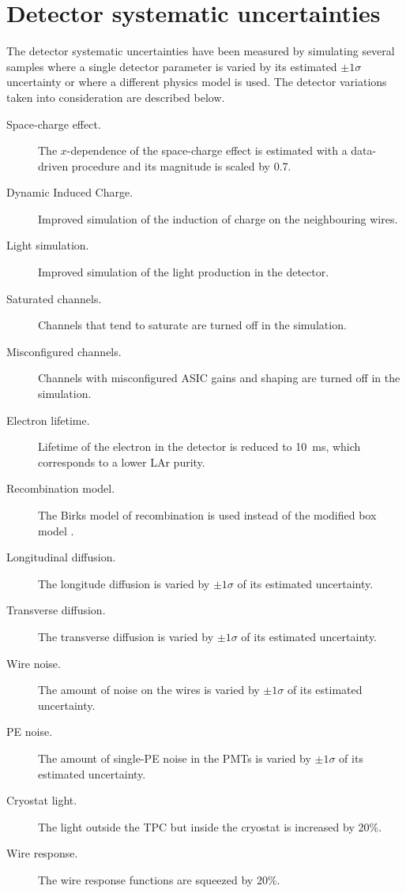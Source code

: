 \section{Detector systematic uncertainties}\label{sec:detector_sys}
The detector systematic uncertainties have been measured by simulating several samples where a single detector parameter is varied by its estimated $\pm1\sigma$ uncertainty or where a different physics model is used. The detector variations taken into consideration are described below.
\begin{description}
\item[Space-charge effect.] The $x$-dependence of the space-charge effect is estimated with a data-driven procedure and its magnitude is scaled by 0.7.
\item[Dynamic Induced Charge.] Improved simulation of the induction of charge on the neighbouring wires.
\item[Light simulation.] Improved simulation of the light production in the detector.
\item[Saturated channels.] Channels that tend to saturate are turned off in the simulation.
\item[Misconfigured channels.] Channels with misconfigured ASIC gains and shaping are turned off in the simulation.
\item[Electron lifetime.] Lifetime of the electron in the detector is reduced to 10~ms, which corresponds to a lower LAr purity.
\item[Recombination model.] The Birks model of recombination \cite{Amoruso:2004dy} is used instead of the modified box model \cite{Acciarri:2013met}. 
\item[Longitudinal diffusion.] The longitude diffusion is varied by $\pm1\sigma$ of its estimated uncertainty.
\item[Transverse diffusion.] The transverse diffusion is varied by $\pm1\sigma$ of its estimated uncertainty.
\item[Wire noise.] The amount of noise on the wires is varied by $\pm1\sigma$ of its estimated uncertainty.
\item[PE noise.] The amount of single-PE noise in the PMTs is varied by $\pm1\sigma$ of its estimated uncertainty.
\item[Cryostat light.] The light outside the TPC but inside the cryostat is increased by 20\%.
\item[Wire response.] The wire response functions are squeezed by 20\%.
\end{description}

